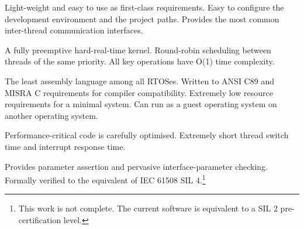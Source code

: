 \begin{description}[leftmargin=0pt,labelindent=0pt,style=nextline,itemsep=8pt]
    \item[\textsf{\color{rmppurple}High usability}]
    Light-weight and easy to use as first-class requirements.
    Easy to configure the development environment and the project paths.
    Provides the most common inter-thread communication interfaces.

    \item[\textsf{\color{rmppurple}Hard real-time}]
    A fully preemptive hard-real-time kernel.
    Round-robin scheduling between threads of the same priority.
    All key operations have O(1) time complexity.

    \item[\textsf{\color{rmppurple}High portability}]
    The least assembly language among all RTOSes.
    Written to ANSI C89 and MISRA C requirements for compiler compatibility.
    Extremely low resource requirements for a minimal system.
    Can run as a guest operating system on another operating system.

    \item[\textsf{\color{rmppurple}High efficiency}]
    Performance-critical code is carefully optimised.
    Extremely short thread switch time and interrupt response time.

    \item[\textsf{\color{rmppurple}High reliability}]
    Provides parameter assertion and pervasive interface-parameter checking.
    Formally verified to the equivalent of IEC 61508 SIL 4.\footnote{This work is not complete. The current software is equivalent to a SIL 2 pre-certification level.}
\end{description}

